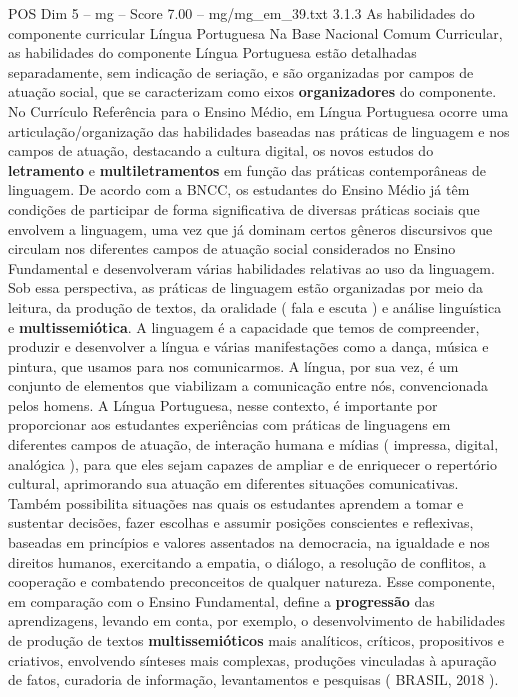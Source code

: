 \begin{textsample}{POS Dim 5 – mg – Score 7.00 – mg/mg\_em\_39.txt}  \label{ex:f5_pos_187}
3.1.3 As habilidades do componente curricular Língua Portuguesa Na Base Nacional Comum Curricular, as habilidades do componente Língua Portuguesa estão detalhadas separadamente, sem indicação de seriação, e são organizadas por campos de atuação social, que se caracterizam como eixos \textbf{organizadores} do componente.
No Currículo Referência para o Ensino Médio, em Língua Portuguesa ocorre uma articulação/organização das habilidades baseadas nas práticas de linguagem e nos campos de atuação, destacando a cultura digital, os novos estudos do \textbf{letramento} e \textbf{multiletramentos} em função das práticas contemporâneas de linguagem.
De acordo com a BNCC, os estudantes do Ensino Médio já têm condições de participar de forma significativa de diversas práticas sociais que envolvem a linguagem, uma vez que já dominam certos gêneros discursivos que circulam nos diferentes campos de atuação social considerados no Ensino Fundamental e desenvolveram várias habilidades relativas ao uso da linguagem.
Sob essa perspectiva, as práticas de linguagem estão organizadas por meio da leitura, da produção de textos, da oralidade ( fala e escuta ) e análise linguística e \textbf{multissemiótica}.
A linguagem é a capacidade que temos de compreender, produzir e desenvolver a língua e várias manifestações como a dança, música e pintura, que usamos para nos comunicarmos.
A língua, por sua vez, é um conjunto de elementos que viabilizam a comunicação entre nós, convencionada pelos homens.
A Língua Portuguesa, nesse contexto, é importante por proporcionar aos estudantes experiências com práticas de linguagens em diferentes campos de atuação, de interação humana e mídias ( impressa, digital, analógica ), para que eles sejam capazes de ampliar e de enriquecer o repertório cultural, aprimorando sua atuação em diferentes situações comunicativas.
Também possibilita situações nas quais os estudantes aprendem a tomar e sustentar decisões, fazer escolhas e assumir posições conscientes e reflexivas, baseadas em princípios e valores assentados na democracia, na igualdade e nos direitos humanos, exercitando a empatia, o diálogo, a resolução de conflitos, a cooperação e combatendo preconceitos de qualquer natureza.
Esse componente, em comparação com o Ensino Fundamental, define a \textbf{progressão} das aprendizagens, levando em conta, por exemplo, o desenvolvimento de habilidades de produção de textos \textbf{multissemióticos} mais analíticos, críticos, propositivos e criativos, envolvendo sínteses mais complexas, produções vinculadas à apuração de fatos, curadoria de informação, levantamentos e pesquisas ( BRASIL, 2018 ).

\end{textsample}
